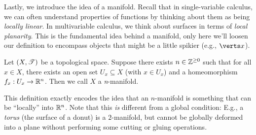 \documentclass{fkpaper}
\begin{document}
\begin{multicols}{2}
  Lastly, we introduce the idea of a manifold. Recall that in
  single-variable calculus, we can often understand properties of
  functions by thinking about them as being \emph{locally linear}. In
  multivariable calculus, we think about surfaces in terms of
  \emph{local planarity}. This is the fundamental idea behind a
  manifold, only here we'll loosen our definition to encompass objects
  that might be a little spikier (e.g., $\abs{x}$).
  \begin{definition}[Manifold]
    Let $(X, {\mathscr{T}})$ be a topological space. Suppose there exists $n
    \in \mathbb{Z}^{\geq 0}$ such that for all $x \in X$, there exists an
    open set $U_x \subseteq X$ (with $x \in U_x$) and a homeomorphism
    $f_x : U_x \to \mathbb{R}^n$. Then we call $X$ a \emph{n}-manifold.
  \end{definition}
  This definition exactly encodes the idea that an $n$-manifold is
  something that can be ``locally'' into $\mathbb{R}^n$. Note that this
  \emph{is} different from a global condition: E.g., a \emph{torus}
  (the surface of a donut) is a $2$-manifold, but cannot be globally
  deformed into a plane without performing some cutting or gluing
  operations.
\end{multicols}




\nocite{*}
\end{document}
